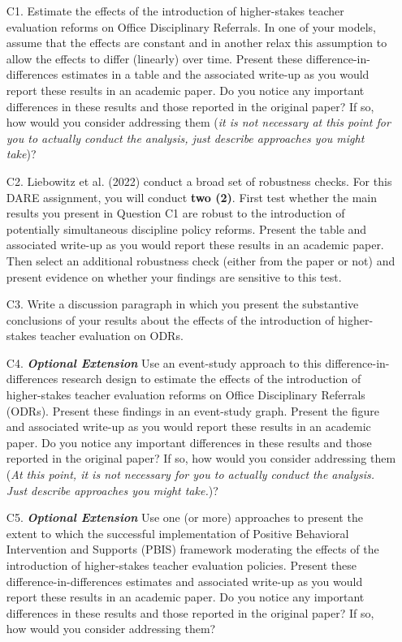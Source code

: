 \documentclass[a4paper, 11pt]{article}
\begin{document}
\begin{enumerate}
	\item[C1.] Estimate the effects of the introduction of higher-stakes teacher evaluation reforms on Office Disciplinary Referrals. In one of your models, assume that the effects are constant and in another relax this assumption to allow the effects to differ (linearly) over time. Present these difference-in-differences estimates in a table and the associated write-up as you would report these results in an academic paper. Do you notice any important differences in these results and those reported in the original paper? If so, how would you consider addressing them (\textit{it is not necessary at this point for you to actually conduct the analysis, just describe approaches you might take})?
	\item[C2.] Liebowitz et al. (2022) conduct a broad set of robustness checks. For this DARE assignment, you will conduct \textbf{two (2)}. First test whether the main results you present in Question C1 are robust to the introduction of potentially simultaneous discipline policy reforms. Present the table and associated write-up as you would report these results in an academic paper. Then select an additional robustness check (either from the paper or not) and present evidence on whether your findings are sensitive to this test.
	\item[C3.] Write a discussion paragraph in which you present the substantive conclusions of your results about the effects of the introduction of higher-stakes teacher evaluation on ODRs.
	\item[C4.]  \textbf{\textit{Optional Extension}} Use an event-study approach to this difference-in-differences research design to estimate the effects of the introduction of higher-stakes teacher evaluation reforms on Office Disciplinary Referrals (ODRs). Present these findings in an event-study graph. Present the figure and associated write-up as you would report these results in an academic paper. Do you notice any important differences in these results and those reported in the original paper? If so, how would you consider addressing them (\textit{At this point, it is not necessary for you to actually conduct the analysis. Just describe approaches you might take.})?
	\item[C5.] \textbf{\textit{Optional Extension}} Use one (or more) approaches to present the extent to which the successful implementation of Positive Behavioral Intervention and Supports (PBIS) framework moderating the effects of the introduction of higher-stakes teacher evaluation policies. Present these difference-in-differences estimates and associated write-up as you would report these results in an academic paper. Do you notice any important differences in these results and those reported in the original paper? If so, how would you consider addressing them?
\end{enumerate}
\end{document}
